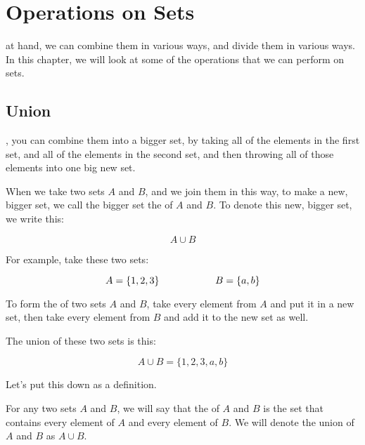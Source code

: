 \documentclass[../../../main.tex]{subfiles}
\begin{document}
\chapter{Operations on Sets}
\label{ch:operations-on-sets}

 at hand, we can combine them in various ways, and divide them in various ways. In this chapter, we will look at some of the operations that we can perform on sets.


\section{Union}
\label{sec:set-union}

, you can combine them into a bigger set, by taking all of the elements in the first set, and all of the elements in the second set, and then throwing all of those elements into one big new set. 

When we take two sets $A$ and $B$, and we join them in this way, to make a new, bigger set, we call the bigger set the  of $A$ and $B$. To denote this new, bigger set, we write this:

\begin{equation*}
  A \cup B
\end{equation*}

For example, take these two sets:

\begin{equation*}
  A = \{ 1, 2, 3 \} \hskip 2cm B = \{ a, b \}
\end{equation*}

\begin{terminology}
  To form the  of two sets $A$ and $B$, take every element from $A$ and put it in a new set, then take every element from $B$ and add it to the new set as well.
\end{terminology}

The union of these two sets is this:

\begin{equation*}
  A \cup B = \{ 1, 2, 3, a, b \}
\end{equation*}

Let's put this down as a definition.

\begin{fdefinition}[Unions]
  For any two sets $A$ and $B$, we will say that the  of $A$ and $B$ is the set that contains every element of $A$ and every element of $B$. We will denote the union of $A$ and $B$ as $A \cup B$.
\end{fdefinition}
\end{document}
